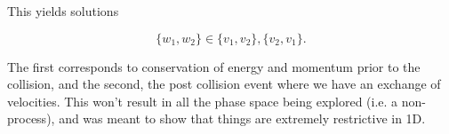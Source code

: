 {This yields solutions

\begin{equation}\label{eqn:midterm1review:280}
\{w_1, w_2\} \in \{v_1, v_2\}, \{v_2, v_1\}.
\end{equation}

The first corresponds to conservation of energy and momentum prior to the collision, and the second, the post collision event where we have an exchange of velocities.  This won't result in all the phase space being explored (i.e. a non- process), and was meant to show that things are extremely restrictive in 1D.
} %
